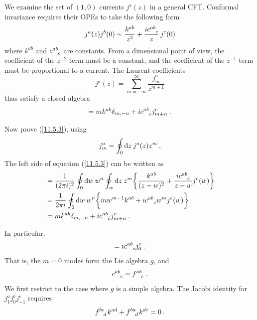 We examine the set of $(1,0)$ currents $j^{a}(z)$ in a general CFT. Conformal invariance requires their OPEs to take the following form
\begin{equation}
	j^{a}(z)j^{b}(0) \sim \frac{k^{ab}}{z^{2}} + \frac{\mi c\indices{^a^b_c}}{z}\,j^{c}(0) \label{11.5.1}
\end{equation}
where $k^{ab}$ and $c\indices{^a^b_c}$ are constants. From a dimensional point of view, the coefficient of the $z^{-2}$ term must be a constant, and the coefficient of the $z^{-1}$ term must be proportional to a current. The Laurent coefficients
\begin{equation}
	j^{a}(z) = \sum_{m=-\infty}^{\infty} \frac{j_{m}^{a}}{z^{m+1}} \label{11.5.2}
\end{equation}
thus satisfy a closed algebra
\begin{equation}
	[j_{m}^{a},j_{n}^{b}]=mk^{ab}\delta_{m,-n}+\mi c\indices{^a^b_c}j^{c}_{m+n} \:. \label{11.5.3}
\end{equation}
\begin{tcolorbox}[breakable]
	Now prove (\ref{11.5.3}), using
	\[
	j_{m}^{a} = \oint_{0}\mathrm{d} z\: j^{a}(z)z^{m} \:,
	\]
	The left side of equation (\ref{11.5.3}) can be written as
	\begin{align*}
		[j_{m}^{a},j_{n}^{b}] &= \frac{1}{(2\pi\mi)^{2}}\oint_{0} \dif w\: w^{n} \oint_{w}\dif z\: z^{m}
		\biggl\{\frac{k^{ab}}{(z-w)^{2}}+\frac{\mi c\indices{^a^b_c}}{z-w}j^{c}(w) \biggr\} \\
		&=\frac{1}{2\pi\mi} \oint_{0} \dif w\: w^{n} \biggl\{mw^{m-1}k^{ab}+ \mi c\indices{^a^b_c}w^{m}j^{c}(w) \biggr\}\\
		&=mk^{ab}\delta_{m,-n}+\mi c\indices{^a^b_c}j^{c}_{m+n} \:.
	\end{align*}
\end{tcolorbox}
\noindent In particular,
\begin{equation}
	[j^{a}_{0},j^{b}_{0}] = \mi c\indices{^a^b_c}j_{0}^{c} \:. \label{11.5.4}
\end{equation}
That is, the $m=0$ modes form the Lie algebra $g$, and
\begin{equation}
	c\indices{^a^b_c}=f\indices{^a^b_c} \:. \label{11.5.5}
\end{equation}
We first restrict to the case where $g$ is a simple algebra. The Jacobi identity for $j_{1}^{a}j_{0}^{b}j_{-1}^{c}$ requires
\begin{equation}
	f\indices{^b^c_d}k^{ad}+f\indices{^b^a_d}k^{dc} = 0 \:. \label{11.5.6}
\end{equation}
